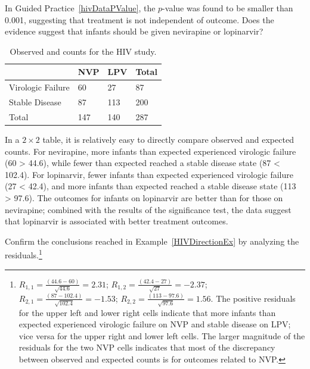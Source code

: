 \begin{example}{In Guided Practice~\ref{hivDataPValue}, the $p$-value was found to be smaller than 0.001, suggesting that treatment is not independent of outcome. Does the evidence suggest that infants should be given nevirapine or lopinarvir?

\begin{table}[h]
	\centering
	\begin{tabular}{l | l l | l}
		\hline
		& NVP & LPV & Total \\
		\hline
		Virologic Failure & 60 \highlightO{44.6} & 27 \highlightO{42.4} & 87 \\
		Stable Disease & 87 \highlightO{102.4} & 113 \highlightO{97.6}& 200 \\	
		\hline
		Total & 147 & 140 & 287 \\
		\hline
	\end{tabular}
	\caption{Observed and  counts for the HIV study.}
\end{table}			
		
} 
	
In a $2 \times 2$ table, it is relatively easy to directly compare observed and expected counts. 
For nevirapine, more infants than expected experienced virologic failure (60 > 44.6), while fewer than expected reached a stable disease state (87 < 102.4). For lopinarvir, fewer infants than expected experienced virologic failure (27 < 42.4), and more infants than expected reached a stable disease state (113 > 97.6). The outcomes for infants on lopinarvir are better than for those on nevirapine; combined with the results of the significance test, the data suggest that lopinarvir is associated with better treatment outcomes.
\label{HIVDirectionEx}	
\end{example}

\begin{exercise} Confirm the conclusions reached in Example~\ref{HIVDirectionEx} by analyzing the residuals.\footnote{$R_{1, 1} = \frac{(44.6-60)}{\sqrt{44.6}} = 2.31$; $R_{1, 2} = \frac{(42.4-27)}{\sqrt{27}} = -2.37$; $R_{2, 1} = \frac{(87-102.4)}{\sqrt{102.4}} = -1.53$; $R_{2, 2} = \frac{(113-97.6)}{\sqrt{97.6}} = 1.56$. The positive residuals for the upper left and lower right cells indicate that more infants than expected experienced virologic failure on NVP and stable disease on LPV; vice versa for the upper right and lower left cells. The larger magnitude of the residuals for the two NVP cells indicates that most of the discrepancy between observed and expected counts is for outcomes related to NVP.}
\end{exercise}

